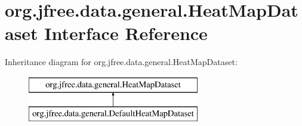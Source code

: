 \hypertarget{interfaceorg_1_1jfree_1_1data_1_1general_1_1_heat_map_dataset}{}\section{org.\+jfree.\+data.\+general.\+Heat\+Map\+Dataset Interface Reference}
\label{interfaceorg_1_1jfree_1_1data_1_1general_1_1_heat_map_dataset}
Inheritance diagram for org.\+jfree.\+data.\+general.\+Heat\+Map\+Dataset\+:\begin{figure}[H]
\begin{center}
\leavevmode
\includegraphics[height=2.000000cm]{interfaceorg_1_1jfree_1_1data_1_1general_1_1_heat_map_dataset}
\end{center}
\end{figure}
